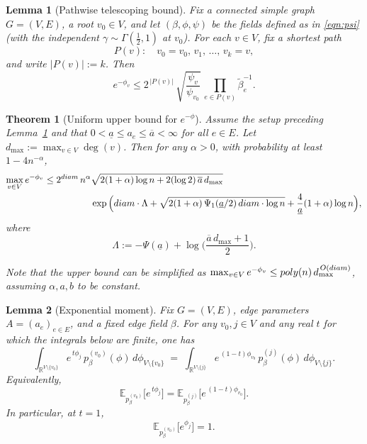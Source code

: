 \documentclass[10pt,a4paper]{amsart}
\newtheorem{lem}{Lemma}
\newtheorem{thm}{Theorem}
\newcommand{\E}{\mathbb{E}}
\newcommand{\diam}{\textnormal{diam}}
\newcommand{\poly}{\textnormal{poly}}
\begin{document}
\begin{lem}[Pathwise telescoping bound]\label{lem:path-telescope}
Fix a connected simple graph $G=(V,E)$, a root $v_0\in V$, and let $(\beta,\phi,\psi)$ be the fields defined as in \eqref{eqn:psi} (with the independent $\gamma\sim\Gamma(\tfrac12,1)$ at $v_0$). For each $v\in V$, fix a shortest path
\[
P(v):\quad v_0=v_0,\,v_1,\,\ldots,\,v_k=v,
\]
and write $|P(v)|:=k$. Then
\begin{equation}\label{eq:path-tele}
e^{-\phi_v}\le 2^{\,|P(v)|}\,\sqrt{\frac{\psi_v}{\psi_{v_0}}}\,\prod_{e\in P(v)}\tilde\beta_e^{-1}.
\end{equation}
\end{lem}

\begin{thm}[Uniform upper bound for $e^{-\phi}$]\label{thm:uniform-upper-clean}
Assume the setup preceding Lemma~\ref{lem:path-telescope} and that $0<\underline{a}\le a_e\le \overline{a}<\infty$ for all $e\in E$. Let $d_{\max}:=\max_{v\in V}\deg(v)$. Then for any $\alpha>0$, with probability at least $1-4n^{-\alpha}$,
\begin{equation}
\begin{aligned}
\max_{v\in V} e^{-\phi_v}
\le 
2^{\diam}\,n^{\alpha} & \sqrt{2(1+\alpha)\log n+2(\log 2)\,\overline{a}\,d_{\max}}\, \\
& \exp\Big(
\diam\cdot\Lambda+ \sqrt{2(1+\alpha)\,\Psi_1(\underline{a}/2)\,\diam\cdot\log n}+ \frac{4}{\underline{a}}(1+\alpha)\log n
\Big), \label{eq:uniform-upper-clean}
\end{aligned}
\end{equation}
where
\[
\Lambda:= -\Psi(\underline{a})+\log\Big(\frac{\overline{a}\,d_{\max}+1}{2}\Big).
\]

Note that the upper bound can be simplified as  $\max_{v\in V} e^{-\phi_v} \le \poly(n) \, d_{\max}^{\,O(\diam)}$, assuming $\alpha, a, b$ to be constant.
\end{thm}

\begin{lem}[Exponential moment]
\label{lem:unit}
Fix $G=(V,E)$, edge parameters $A=(a_e)_{e\in E}$, and a fixed edge field $\beta$.
For any $v_0,j\in V$ and any real $t$ for which the integrals below are finite, one has
\[
\int_{\mathbb{R}^{V\setminus\{v_0\}}} e^{\,t\phi_j}\,p_\beta^{(v_0)}(\phi)\,d\phi_{V\setminus\{v_0\}}
\;=\;
\int_{\mathbb{R}^{V\setminus\{j\}}} e^{\,(1-t)\phi_{v_0}}\,p_\beta^{(j)}(\phi)\,d\phi_{V\setminus\{j\}}.
\]
Equivalently,
\[
\E_{p_\beta^{(v_0)}}\big[e^{\,t\phi_j}\big]
=
\E_{p_\beta^{(j)}}\big[e^{\,(1-t)\phi_{v_0}}\big].
\]
In particular, at $t=1$,
\[
\E_{p_\beta^{(v_0)}}\big[e^{\phi_j}\big]=1.
\]
\end{lem}
\end{document}
